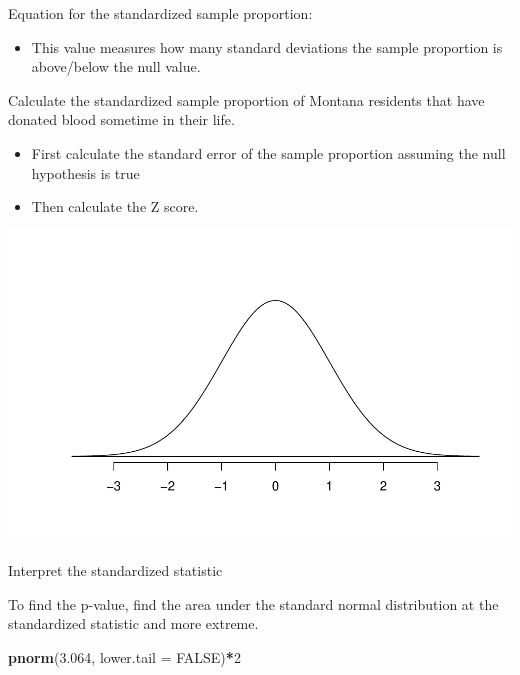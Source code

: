 \documentclass[
]{report}
\newenvironment{Shaded}{\begin{snugshade}}{\end{snugshade}}
\newcommand{\AttributeTok}[1]{\textcolor[rgb]{0.13,0.29,0.53}{#1}}
\newcommand{\ConstantTok}[1]{\textcolor[rgb]{0.56,0.35,0.01}{#1}}
\newcommand{\DecValTok}[1]{\textcolor[rgb]{0.00,0.00,0.81}{#1}}
\newcommand{\FloatTok}[1]{\textcolor[rgb]{0.00,0.00,0.81}{#1}}
\newcommand{\FunctionTok}[1]{\textcolor[rgb]{0.13,0.29,0.53}{\textbf{#1}}}
\newcommand{\NormalTok}[1]{#1}
\newcommand{\SpecialCharTok}[1]{\textcolor[rgb]{0.81,0.36,0.00}{\textbf{#1}}}
\providecommand{\tightlist}{%
  \setlength{\itemsep}{0pt}\setlength{\parskip}{0pt}}
\begin{document}

Equation for the standardized sample proportion:

\vspace{0.5in}


\begin{itemize}
\tightlist
\item
  This value measures how many standard deviations the sample proportion is above/below the null value.
\end{itemize}


Calculate the standardized sample proportion of Montana residents that have donated blood sometime in their life.

\begin{itemize}
\tightlist
\item
  First calculate the standard error of the sample proportion assuming the null hypothesis is true
\end{itemize}

\vspace{0.5in}

\begin{itemize}
\tightlist
\item
  Then calculate the Z score.
\end{itemize}

\vspace{0.5in}

\begin{center}\includegraphics[width=0.5\linewidth]{04-VN04-1cat_theory_files/figure-latex/standNormalc-1} \end{center}

Interpret the standardized statistic

\vspace{0.5in}

To find the p-value, find the area under the standard normal distribution at the standardized statistic and more extreme.

\begin{Shaded}
\begin{Highlighting}[]
\FunctionTok{pnorm}\NormalTok{(}\FloatTok{3.064}\NormalTok{, }\AttributeTok{lower.tail =} \ConstantTok{FALSE}\NormalTok{)}\SpecialCharTok{*}\DecValTok{2}
\end{Highlighting}
\end{Shaded}
\end{document}
